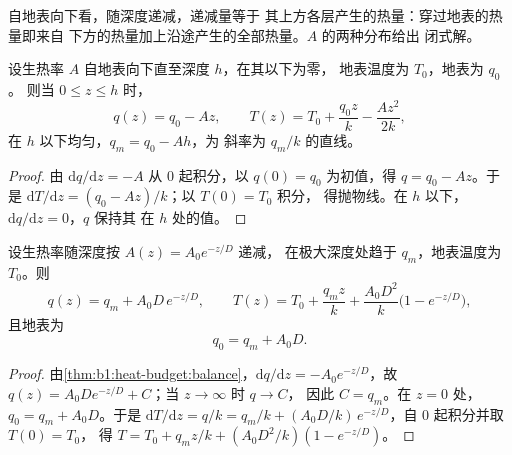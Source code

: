 自地表向下看，随深度递减，递减量等于
其上方各层产生的热量：穿过地表的热量即来自
下方的热量加上沿途产生的全部热量。$A$ 的两种分布给出
闭式解。

\begin{proposition}[均匀放射性层]\label{prop:b1:heat-budget:uniform}
设生热率 $A$ 自地表向下直至深度 $h$，在其以下为零，
地表温度为 $T_0$，地表为 $q_0$。
则当 $0 \le z \le h$ 时，
\[
  q(z) = q_0 - A z, \qquad T(z) = T_0 + \frac{q_0 z}{k} - \frac{A z^2}{2k},
\]
在 $h$ 以下均匀，$q_m = q_0 - A h$，为
斜率为 $q_m/k$ 的直线。
\end{proposition}

\begin{proof}
由 $\mathrm dq/\mathrm dz = -A$ 从 $0$ 起积分，以 $q(0) = q_0$ 为初值，得 $q = q_0 -
Az$。于是 $\mathrm dT/\mathrm dz = (q_0 - Az)/k$；以 $T(0) = T_0$ 积分，
得抛物线。在 $h$ 以下，$\mathrm dq/\mathrm dz = 0$，$q$ 保持其
在 $h$ 处的值。
\end{proof}

\begin{theorem}[指数型生热率与线性热流关系]
\label{thm:b1:heat-budget:exponential}
设生热率随深度按 $A(z) = A_0 e^{-z/D}$ 递减，
在极大深度处趋于 $q_m$，地表温度为 $T_0$。则
\[
  q(z) = q_m + A_0 D\,e^{-z/D}, \qquad
  T(z) = T_0 + \frac{q_m z}{k} + \frac{A_0 D^2}{k}\bigl(1 - e^{-z/D}\bigr),
\]
且地表为
\[
  q_0 = q_m + A_0 D .
\]
\end{theorem}

\begin{proof}
由\cref{thm:b1:heat-budget:balance}，$\mathrm dq/\mathrm dz =
-A_0e^{-z/D}$，故 $q(z) = A_0 D e^{-z/D} + C$；当 $z \to \infty$ 时 $q \to C$，
因此 $C = q_m$。在 $z = 0$ 处，$q_0 = q_m + A_0 D$。于是 $\mathrm dT/\mathrm dz =
q/k = q_m/k + (A_0D/k)\,e^{-z/D}$，自 $0$ 起积分并取 $T(0) = T_0$，
得 $T = T_0 + q_m z/k + (A_0 D^2/k)(1 - e^{-z/D})$。
\end{proof}

